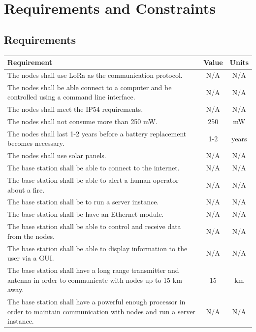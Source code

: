 \documentclass{article}
\begin{document}
\section{Requirements and Constraints}
\subsection{Requirements}
\begin{tabularx}{\linewidth}{|X|c|c|}
\hline
Requirement & Value & Units \\
\hline
The nodes shall use LoRa as the communication protocol. & N/A & N/A \\\hline
The nodes shall be able connect to a computer and be controlled using a command line interface. & N/A & N/A \\\hline
The nodes shall meet the IP54 requirements. & N/A & N/A \\\hline
The nodes shall not consume more than 250 mW. & 250 & mW \\\hline
The nodes shall last 1-2 years before a battery replacement becomes necessary. & 1-2 & years \\\hline
The nodes shall use solar panels. & N/A & N/A \\\hline
The base station shall be able to connect to the internet. & N/A & N/A \\\hline
The base station shall be able to alert a human operator about a fire. & N/A & N/A \\\hline
The base station shall be to run a server instance. & N/A & N/A \\\hline
The base station shall be have an Ethernet module. & N/A & N/A \\\hline
The base station shall be able to control and receive data from the nodes. & N/A & N/A \\\hline
The base station shall be able to display information to the user via a GUI. & N/A & N/A \\\hline
The base station shall have a long range transmitter and antenna in order to communicate with nodes up to 15 km away. & 15 & km \\\hline
The base station shall have a powerful enough processor in order to maintain communication with nodes and run a server instance. & N/A & N/A \\\hline


\end{tabularx}
\end{document}
